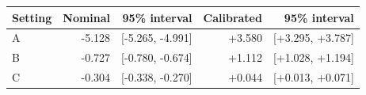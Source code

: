 \begin{tabular}{@{}lrrrr@{}}
\toprule
Setting & Nominal & 95\% interval & Calibrated & 95\% interval\\
\midrule
A & -5.128 & [-5.265, -4.991] & +3.580 & [+3.295, +3.787]\\
B & -0.727 & [-0.780, -0.674] & +1.112 & [+1.028, +1.194]\\
C & -0.304 & [-0.338, -0.270] & +0.044 & [+0.013, +0.071]\\
\bottomrule
\end{tabular}
